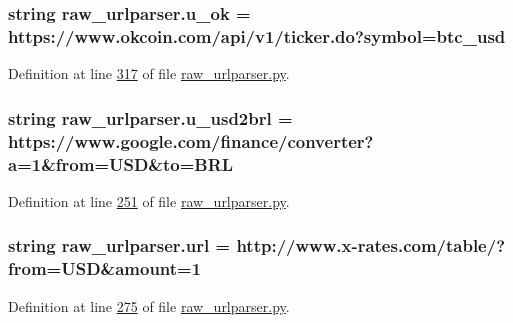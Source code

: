 \subsubsection[{\texorpdfstring{u\+\_\+ok}{u_ok}}]{\setlength{\rightskip}{0pt plus 5cm}string raw\+\_\+urlparser.\+u\+\_\+ok = \textquotesingle{}https\+://www.\+okcoin.\+com/api/v1/ticker.\+do?symbol=btc\+\_\+usd\textquotesingle{}}\hypertarget{namespaceraw__urlparser_a22c1a17803a88426d38d70ad6d4290d2}{}\label{namespaceraw__urlparser_a22c1a17803a88426d38d70ad6d4290d2}


Definition at line \hyperlink{raw__urlparser_8py_source_l00317}{317} of file \hyperlink{raw__urlparser_8py_source}{raw\+\_\+urlparser.\+py}.

\subsubsection[{\texorpdfstring{u\+\_\+usd2brl}{u_usd2brl}}]{\setlength{\rightskip}{0pt plus 5cm}string raw\+\_\+urlparser.\+u\+\_\+usd2brl = \textquotesingle{}https\+://www.\+google.\+com/finance/converter?a=1\&from=U\+SD\&to=B\+RL\textquotesingle{}}\hypertarget{namespaceraw__urlparser_a63e1f0abe7b1f43c4891ce9aec98261d}{}\label{namespaceraw__urlparser_a63e1f0abe7b1f43c4891ce9aec98261d}


Definition at line \hyperlink{raw__urlparser_8py_source_l00251}{251} of file \hyperlink{raw__urlparser_8py_source}{raw\+\_\+urlparser.\+py}.

\subsubsection[{\texorpdfstring{url}{url}}]{\setlength{\rightskip}{0pt plus 5cm}string raw\+\_\+urlparser.\+url = \textquotesingle{}http\+://www.\+x-\/rates.\+com/table/?from=U\+SD\&amount=1\textquotesingle{}}\hypertarget{namespaceraw__urlparser_a9242b893f4f49ef7cc0d4e599b70daa4}{}\label{namespaceraw__urlparser_a9242b893f4f49ef7cc0d4e599b70daa4}


Definition at line \hyperlink{raw__urlparser_8py_source_l00275}{275} of file \hyperlink{raw__urlparser_8py_source}{raw\+\_\+urlparser.\+py}.

